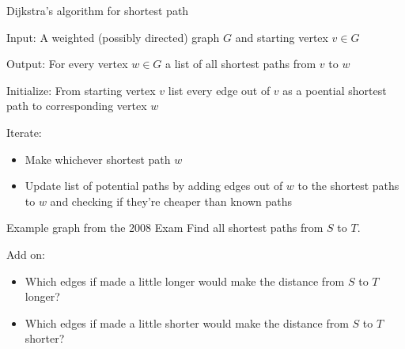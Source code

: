 \documentclass{beamer}
\begin{document}
\begin{frame}{Dijkstra's algorithm for shortest path}
  \begin{block}{Input:} A weighted (possibly directed) graph $G$ and starting vertex $v\in G$
  \end{block}
  \begin{block}{Output:} For every vertex $w\in G$ a list of all shortest paths from $v$ to $w$
  \end{block}
  
 \begin{block}{Initialize:}
   From starting vertex $v$ list every edge out of $v$ as a poential shortest path to corresponding vertex $w$
   \end{block}
       \begin{block}{Iterate:}
 \begin{itemize}
 \item Make whichever shortest path $w$ 


 \item Update list of potential paths by adding edges out of $w$ to the shortest paths to $w$ and checking if they're cheaper than known paths
   \end{itemize}
 \end{block}
  \end{frame}

\begin{frame}{Example graph from the 2008 Exam}
Find all shortest paths from $S$ to $T$.
\begin{center}
\end{center}

\begin{block}{Add on:}
\begin{itemize}
\item  Which edges if made a little longer would make the distance from $S$ to $T$ longer?
\item  Which edges if made a little shorter would make the distance from $S$ to $T$ shorter?
\end{itemize}
\end{block}

  \end{frame}
\end{document}
